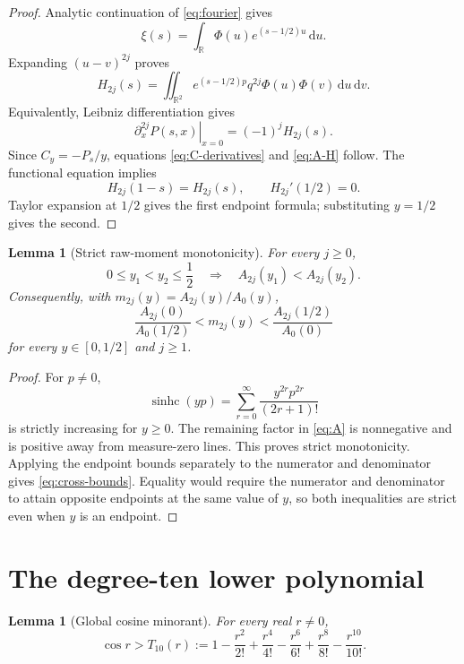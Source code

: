\documentclass[11pt]{amsart}
\newtheorem{lemma}[theorem]{Lemma}
\theoremstyle{remark}
\newcommand{\sinhc}{\operatorname{sinhc}}
\newcommand{\R}{\mathbb{R}}
\newcommand{\dd}{\,\mathrm{d}}
\begin{document}
\begin{proof}
Analytic continuation of \eqref{eq:fourier} gives
\[
\xi(s)=\int_{\R}\Phi(u)e^{(s-1/2)u}\dd u.
\]
Expanding $(u-v)^{2j}$ proves
\[
H_{2j}(s)=\iint_{\R^2}
e^{(s-1/2)p}q^{2j}\Phi(u)\Phi(v)\dd u\dd v.
\]
Equivalently, Leibniz differentiation gives
\[
\left.\partial_x^{2j}P(s,x)\right|_{x=0}=(-1)^jH_{2j}(s).
\]
Since $C_y=-P_s/y$, equations \eqref{eq:C-derivatives} and
\eqref{eq:A-H} follow.  The functional equation implies
\[
H_{2j}(1-s)=H_{2j}(s),
\qquad H_{2j}'(1/2)=0.
\]
Taylor expansion at $1/2$ gives the first endpoint formula; substituting
$y=1/2$ gives the second.
\end{proof}

\begin{lemma}[Strict raw-moment monotonicity]\label{lem:monotonicity}
For every $j\geq0$,
\[
0\leq y_1<y_2\leq\frac12
\quad\Longrightarrow\quad
A_{2j}(y_1)<A_{2j}(y_2).
\]
Consequently, with $m_{2j}(y)=A_{2j}(y)/A_0(y)$,
\begin{equation}\label{eq:cross-bounds}
\frac{A_{2j}(0)}{A_0(1/2)}
<m_{2j}(y)<
\frac{A_{2j}(1/2)}{A_0(0)}
\end{equation}
for every $y\in[0,1/2]$ and $j\geq1$.
\end{lemma}

\begin{proof}
For $p\neq0$,
\[
\sinhc(yp)=\sum_{r=0}^{\infty}
\frac{y^{2r}p^{2r}}{(2r+1)!}
\]
is strictly increasing for $y\geq0$.  The remaining factor in
\eqref{eq:A} is nonnegative and is positive away from measure-zero lines.
This proves strict monotonicity.  Applying the endpoint bounds separately to
the numerator and denominator gives \eqref{eq:cross-bounds}.  Equality would
require the numerator and denominator to attain opposite endpoints at the
same value of $y$, so both inequalities are strict even when $y$ is an
endpoint.
\end{proof}

\section{The degree-ten lower polynomial}

\begin{lemma}[Global cosine minorant]\label{lem:cosine}
For every real $r\neq0$,
\begin{equation}\label{eq:T10}
\cos r>
T_{10}(r):=
1-\frac{r^2}{2!}+\frac{r^4}{4!}-\frac{r^6}{6!}
+\frac{r^8}{8!}-\frac{r^{10}}{10!}.
\end{equation}
\end{lemma}
\end{document}
